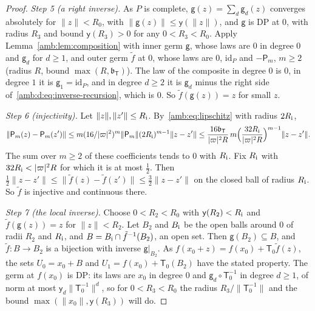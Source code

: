 \documentclass[11pt]{amsart}
\theoremstyle{definition}
\theoremstyle{remark}
\numberwithin{equation}{section}
\newcommand{\id}{\mathrm{id}}
\newcommand{\abs}[1]{\lvert #1\rvert}
\newcommand{\norm}[1]{\lVert #1\rVert}
\theoremstyle{plain}
\theoremstyle{definition}
\theoremstyle{plain}
\begin{document}
\begin{proof}
\emph{Step 5 (a right inverse).} As $P$ is complete, $\mathsf g(z)=\sum_d\mathsf g_d(z)$ converges absolutely for
$\norm z<R_0$, with $\norm{\mathsf g(z)}\le\mathsf y(\norm z)$, and $\mathsf g$ is DP at $0$, with radius $R_3$ and bound $\mathsf y(R_3)>0$ for any $0<R_3<R_0$. Apply
Lemma~\ref{amb:lem:composition} with inner germ $\mathsf g$, whose laws are $0$ in degree $0$ and $\mathsf g_d$ for $d\ge1$, and outer
germ $\tilde f$ at $0$, whose laws are $0$, $\id_P$ and $-\mathsf P_m$, $m\ge2$ (radius $R$, bound $\max(R,\mathfrak b_{\mathsf T})$). The law of the composite in degree $0$ is $0$, in
degree $1$ it is $\mathsf g_1=\id_P$, and in degree $d\ge2$ it is $\mathsf g_d$ minus the right side
of~\eqref{amb:d:eq:inverse-recursion}, which is $0$. So $\tilde f(\mathsf g(z))=z$ for small $z$.

\emph{Step 6 (injectivity).} Let $\norm z,\norm{z'}\le R_{\rm i}$. By~\eqref{amb:eq:lipschitz} with radius $2R_{\rm i}$,
\[
 \norm{\mathsf P_m(z)-\mathsf P_m(z')}\le m(16/\abs\varpi^2)^m\norm{\mathsf P_m}(2R_{\rm i})^{m-1}\norm{z-z'}
 \le\frac{16\mathfrak b_{\mathsf T}}{\abs\varpi^2R}\,m\Bigl(\frac{32R_{\rm i}}{\abs\varpi^2R}\Bigr)^{m-1}\norm{z-z'}.
\]
The sum over $m\ge2$ of these coefficients tends to $0$ with $R_{\rm i}$. Fix $R_{\rm i}$ with $32R_{\rm i}<\abs\varpi^2R$ for which it is at most
$\frac12$. Then
$\frac12\norm{z-z'}\le\norm{\tilde f(z)-\tilde f(z')}\le\frac32\norm{z-z'}$ on the closed ball of radius $R_{\rm i}$. So $\tilde f$ is
injective and continuous there.

\emph{Step 7 (the local inverse).} Choose $0<R_2<R_0$ with $\mathsf y(R_2)<R_{\rm i}$ and $\tilde f(\mathsf g(z))=z$ for $\norm z<R_2$. Let
$B_2$ and $B_{\rm i}$ be the open balls around $0$ of radii $R_2$ and $R_{\rm i}$, and $B=B_{\rm i}\cap\tilde f^{-1}(B_2)$, an open set. Then
$\mathsf g(B_2)\subseteq B$, and $\tilde f\colon B\to B_2$ is a bijection with inverse $\mathsf g|_{B_2}$. As $f(x_0+z)=f(x_0)+\mathsf T_0\tilde f(z)$, the
sets $U_0=x_0+B$ and $U_1=f(x_0)+\mathsf T_0(B_2)$ have the stated property. The germ at $f(x_0)$ is DP: its laws are $x_0$ in degree $0$ and $\mathsf g_d\circ\mathsf T_0^{-1}$ in degree $d\ge1$,
of norm at most $\mathsf y_d\norm{\mathsf T_0^{-1}}^d$, so for $0<R_3<R_0$ the radius $R_3/\norm{\mathsf T_0^{-1}}$ and the bound $\max(\norm{x_0},\mathsf y(R_3))$ will do.
\end{proof}
\end{document}
